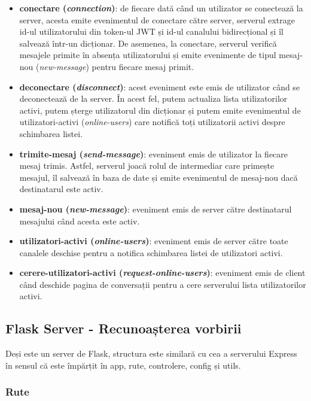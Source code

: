 \begin{itemize}
    \item \textbf{conectare (\textit{connection})}: de fiecare dată când un utilizator se conectează la server, acesta emite
    evenimentul de conectare către server, serverul extrage id-ul utilizatorului din token-ul JWT și id-ul canalului bidirecțional
    și îl salvează într-un dicționar. De asemenea, la conectare, serverul verifică mesajele primite în absența utilizatorului 
    și emite evenimente de tipul mesaj-nou (\textit{new-message}) pentru fiecare mesaj primit.
    \item \textbf{deconectare (\textit{disconnect})}: acest eveniment este emis de utilizator când se deconectează de la server. 
    În acest fel, putem actualiza lista utilizatorilor activi, putem șterge utilizatorul din dicționar și putem emite evenimentul
    de utilizatori-activi (\textit{online-users}) care notifică toți utilizatorii activi despre schimbarea listei.
    \item \textbf{trimite-mesaj (\textit{send-message})}: eveniment emis de utilizator la fiecare mesaj trimis. Astfel, serverul
    joacă rolul de intermediar care primește mesajul, îl salvează în baza de date și emite evenimentul de mesaj-nou dacă
    destinatarul este activ.
    \item \textbf{mesaj-nou (\textit{new-message})}: eveniment emis de server către destinatarul mesajului când acesta este activ.
    \item \textbf{utilizatori-activi (\textit{online-users})}: eveniment emis de server către toate canalele deschise pentru a
    notifica schimbarea listei de utilizatori activi.
    \item \textbf{cerere-utilizatori-activi (\textit{request-online-users})}: eveniment emis de client când deschide pagina de
    conversații pentru a cere serverului lista utilizatorilor activi.
\end{itemize}

\subsection{Flask Server - Recunoașterea vorbirii}
Deși este un server de Flask, structura este similară cu cea a serverului Express în sensul
că este împărțit în app, rute, controlere, config și utils.

\subsubsection{Rute}

